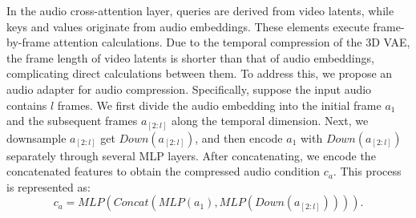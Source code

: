 \documentclass{article}
\begin{document}
In the audio cross-attention layer, queries are derived from video latents, while keys and values originate from audio embeddings. These elements execute frame-by-frame attention calculations. Due to the temporal compression of the 3D VAE, the frame length of video latents is shorter than that of audio embeddings, complicating direct calculations between them.
To address this, we propose an audio adapter for audio compression. Specifically, suppose the input audio contains $l$ frames.
We first divide the audio embedding into the initial frame $a_1$ and the subsequent frames $a_{\left [2:l\right ] }$ along the temporal dimension. Next, we downsample $a_{\left [2:l\right ] }$ get $Down(a_{\left [2:l\right ] })$, and then encode $a_1$ with $Down(a_{\left [2:l\right ] })$ separately through several MLP layers. After concatenating, we encode the concatenated features to obtain the compressed audio condition $c_a$. This process is represented as: 
\begin{equation}
c_a = MLP(Concat(MLP(a_1), MLP(Down(a_{\left [2:l\right ] })))).
\end{equation}



\end{document}
